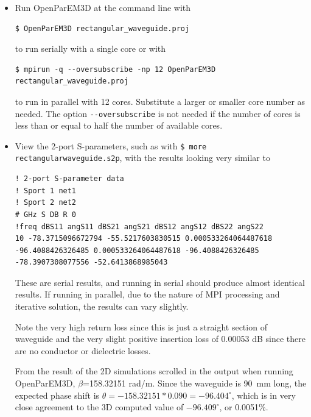 \documentclass[titlepage]{article}
\renewcommand\_{\textunderscore\linebreak[1]}
\begin{document}
\begin{itemize}
\item Run OpenParEM3D at the command line with
\begin{Verbatim}[fontsize=\small]
   $ OpenParEM3D rectangular_waveguide.proj
\end{Verbatim}
to run serially with a single core or with
\begin{Verbatim}[fontsize=\small]
   $ mpirun -q --oversubscribe -np 12 OpenParEM3D rectangular_waveguide.proj
\end{Verbatim}
to run in parallel with 12 cores.  Substitute a larger or smaller core number as needed.  The option \verb+--oversubscribe+ is not needed if the number of cores is less than or equal to half the number of available cores.
\item View the 2-port S-parameters, such as with \texttt{\$ more rectangular\_waveguide.s2p}, with the results looking very similar to 
\begin{Verbatim}[fontsize=\tiny]
! 2-port S-parameter data
! Sport 1 net1
! Sport 2 net2
# GHz S DB R 0
!freq dBS11 angS11 dBS21 angS21 dBS12 angS12 dBS22 angS22
10 -78.3715096672794 -55.5217603830515 0.000533264064487618 -96.4088426326485 0.000533264064487618 -96.4088426326485 -78.3907308077556 -52.6413868985043
\end{Verbatim}
These are serial results, and running in serial should produce almost identical results.  If running in parallel, due to the nature of MPI processing and iterative solution, the results can vary slightly.

Note the very high return loss since this is just a straight section of waveguide and the very slight positive insertion loss of 0.00053 dB since there are no conductor or dielectric losses.

From the result of the 2D simulations scrolled in the output when running OpenParEM3D, $\beta$=158.32151 rad/m.  Since the waveguide is 90~mm long, the expected phase shift is
 $\theta=-158.32151*0.090=-96.404^\circ$,
 which is in very close agreement to the 3D computed value of $-96.409^\circ$, or 0.0051\%.


\end{itemize}
\end{document}
